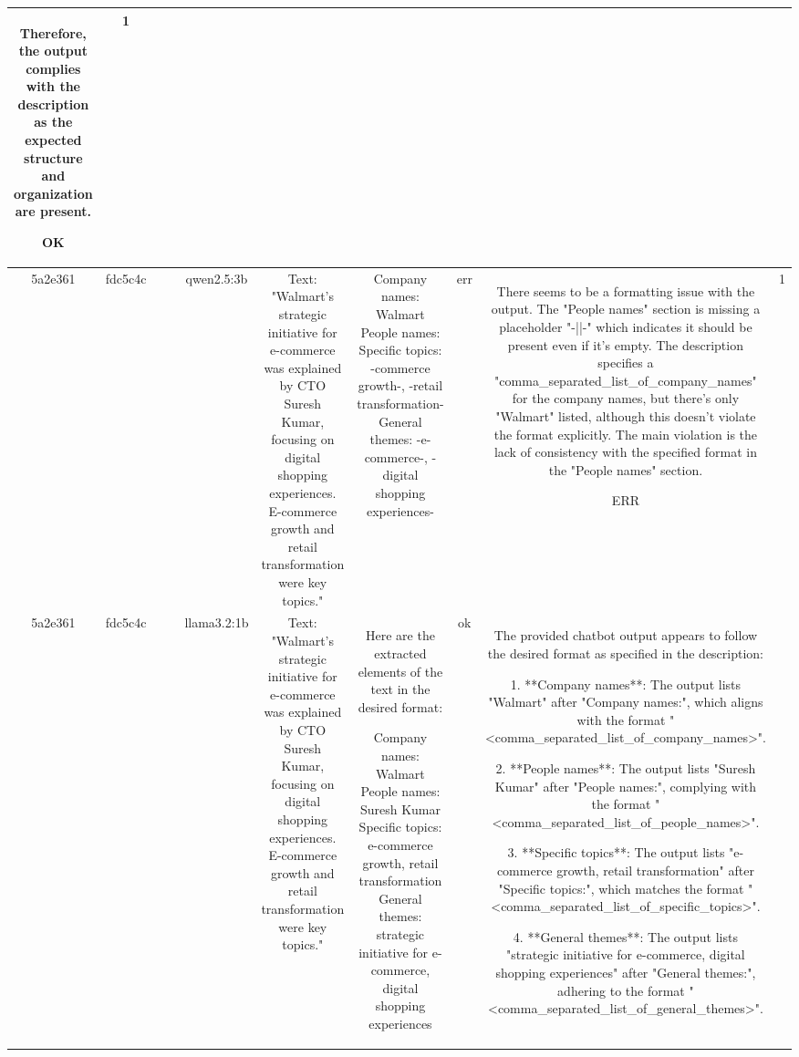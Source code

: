 \begin{table}[h!]
\begin{tabular}{|c|c|c|c|c|c|c|c|c|c|}
Therefore, the output complies with the description as the expected structure and organization are present.

OK & 1\\
\hline
5a2e361 & fdc5c4c &  &  & qwen2.5:3b & Text: "Walmart's strategic initiative for e-commerce was explained by CTO Suresh Kumar, focusing on digital shopping experiences. E-commerce growth and retail transformation were key topics." & Company names: Walmart
People names: 
Specific topics: -commerce growth-, -retail transformation-
General themes: -e-commerce-, -digital shopping experiences- & err & There seems to be a formatting issue with the output. The "People names" section is missing a placeholder "-||-" which indicates it should be present even if it's empty. The description specifies a "comma_separated_list_of_company_names" for the company names, but there's only "Walmart" listed, although this doesn't violate the format explicitly. The main violation is the lack of consistency with the specified format in the "People names" section.

ERR & 1\\
\hline
5a2e361 & fdc5c4c &  &  & llama3.2:1b & Text: "Walmart's strategic initiative for e-commerce was explained by CTO Suresh Kumar, focusing on digital shopping experiences. E-commerce growth and retail transformation were key topics." & Here are the extracted elements of the text in the desired format:

Company names: Walmart
People names: Suresh Kumar
Specific topics: e-commerce growth, retail transformation
General themes: strategic initiative for e-commerce, digital shopping experiences & ok & The provided chatbot output appears to follow the desired format as specified in the description:

1. **Company names**: The output lists "Walmart" after "Company names:", which aligns with the format "<comma_separated_list_of_company_names>".

2. **People names**: The output lists "Suresh Kumar" after "People names:", complying with the format "<comma_separated_list_of_people_names>".

3. **Specific topics**: The output lists "e-commerce growth, retail transformation" after "Specific topics:", which matches the format "<comma_separated_list_of_specific_topics>".

4. **General themes**: The output lists "strategic initiative for e-commerce, digital shopping experiences" after "General themes:", adhering to the format "<comma_separated_list_of_general_themes>".


\end{tabular}
\end{table}
